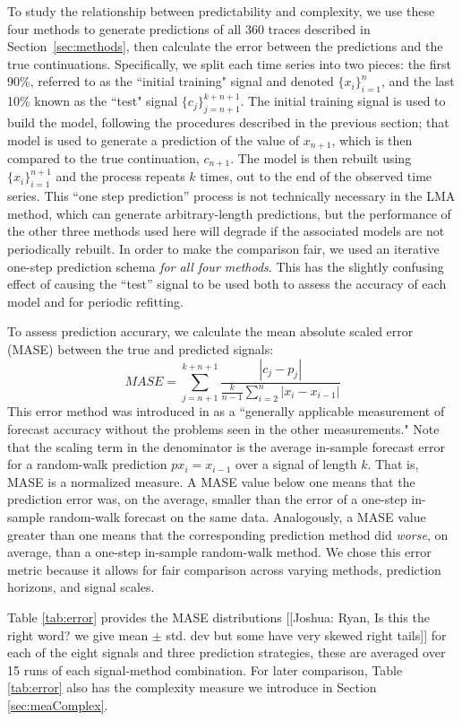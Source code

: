 To study the relationship between predictability and complexity, we
use these four methods to generate predictions of all 360 traces
described in Section~\ref{sec:methods}, then calculate the error
between the predictions and the true continuations.  Specifically, we
split each time series into two pieces: the first 90\%, referred to as
the ``initial training" signal and denoted $\{x_i\}_{i=1}^{n}$, and
the last 10\% known as the ``test" signal $\{c_j\}_{j=n+1}^{k+n+1}$.
The initial training signal is used to build the model, following the
procedures described in the previous section; that model is used to
generate a prediction of the value of $x_{n+1}$, which is then
compared to the true continuation, $c_{n+1}$.  The model is then
rebuilt using $\{x_i\}_{i=1}^{n+1}$ and the process repeats $k$ times,
out to the end of the observed time series.  This ``one step
prediction'' process is not technically necessary in the LMA method,
which can generate arbitrary-length predictions, but the performance
of the other three methods used here will degrade if the associated
models are not periodically rebuilt.  In order to make the comparison
fair, we used an iterative one-step prediction schema {\sl for all
  four methods}.  This has the slightly confusing effect of causing
the ``test'' signal to be used both to assess the accuracy of each
model and for periodic refitting.

To assess prediction accurary, we calculate the mean absolute scaled
error (MASE) between the true and predicted signals:
% 
$$MASE = \sum_{j=n+1}^{k+n+1}\frac{|c_j-p_j| }{\frac{k}{n-1}\sum^n_{i=2}|x_{i}-x_{i-1}|}$$
% 
This error method was introduced in \cite{MASE} as a ``generally
applicable measurement of forecast accuracy without the problems seen
in the other measurements."  Note that the scaling term in the
denominator
% 
% 
is the average in-sample forecast error for a random-walk prediction
$px_i=x_{i-1}$ over a signal of length $k$.  That is, MASE is a
normalized measure.  A MASE value below one means that the prediction
error was, on the average, smaller than the error of a one-step
in-sample random-walk forecast on the same data.  Analogously, a MASE
value greater than one means that the corresponding prediction method
did \emph{worse}, on average, than a one-step in-sample random-walk
method.  We chose this error metric because it allows for fair
comparison across varying methods, prediction horizons, and signal
scales.

Table \ref{tab:error} provides the MASE distributions {\color{red}[[Joshua: Ryan, Is this the right word? we give mean $\pm$ std. dev but some have very skewed right tails]]} for each of the eight signals and three prediction strategies, these are averaged over 15 runs of each signal-method combination. For later comparison, Table \ref{tab:error} also has the complexity measure we introduce in Section  \ref{sec:meaComplex}. 



